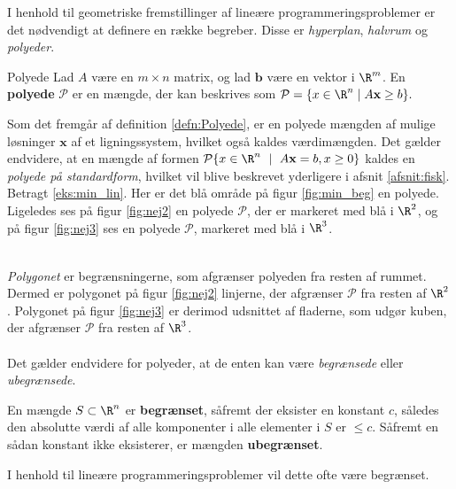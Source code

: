 I henhold til geometriske fremstillinger af lineære programmeringsproblemer er det nødvendigt at definere en række begreber.
Disse er \textit{hyperplan}, \textit{halvrum} og \textit{polyeder}.
%
\begin{defn}{}{Polyede}
Lad $A$ være en $m \times n$ matrix, og lad $\mathbf{b}$ være en vektor i  $\R^m$.
En \textbf{polyede} $\mathcal{P}$ er en mængde, der kan beskrives som 
$\mathcal{P} = \{x\in \R^n \mid A\mathbf{x}\geq b\}.$
%
\end{defn}
\noindent
%
Som det fremgår af definition \ref{defn:Polyede}, er en polyede mængden af mulige løsninger $\mathbf{x}$ af et ligningssystem, hvilket også kaldes værdimængden.
Det gælder endvidere, at en mængde af formen $\mathcal{P} \{x \in \R^n \text{ } \mid \text{ } A\textbf{x} = b,x \geq 0 \}$ kaldes en \textit{polyede på standardform}, hvilket vil blive beskrevet yderligere i afsnit \ref{afsnit:fisk}.
%
%
Betragt \ref{eks:min_lin}.
Her er det blå område på figur \ref{fig:min_beg} en polyede. 
Ligeledes ses på figur \ref{fig:nej2} en polyede $\mathcal{P}$, der er markeret med blå i $\R^2$, og på figur \ref{fig:nej3} ses en polyede $\mathcal{P}$, markeret med blå i $\R^3$. 
%
%
\begin{center}
$
\begin{array}{cc}
&

\end{array}
$
\end{center}
%
\textit{Polygonet} er begrænsningerne, som afgrænser polyeden fra resten af rummet. 
Dermed er polygonet på figur \ref{fig:nej2} linjerne, der afgrænser $\mathcal{P}$ fra resten af $\R^2$.
Polygonet på figur \ref{fig:nej3} er derimod udsnittet af fladerne, som udgør kuben, der afgrænser $\mathcal{P}$ fra resten af $\R^3$.
\\\\
%
Det gælder endvidere for polyeder, at de enten kan være \textit{begrænsede} eller \textit{ubegrænsede}.
%
\begin{defn}{}{}
En mængde $S \subset \R^n$ er \textbf{begrænset}, såfremt der eksister en konstant $c$, således den absolutte værdi af alle komponenter i alle elementer i $S$ er $\leq c$. 
Såfremt en sådan konstant ikke eksisterer, er mængden \textbf{ubegrænset}. 
\end{defn}
\noindent
% 
%
%
I henhold til lineære programmeringsproblemer vil dette ofte være begrænset.

